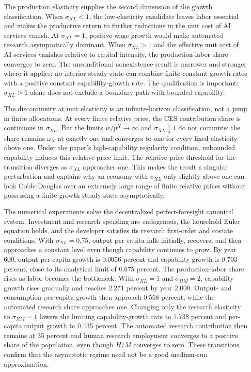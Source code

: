 The production elasticity supplies the second dimension of the growth classification.
When $\sigma_{XL}<1$, the low-elasticity candidate leaves labor essential
and makes the productive return to further reductions in the unit cost of AI services
vanish. At $\sigma_{XL}=1$, positive wage growth would make automated research
asymptotically dominant. When $\sigma_{XL}>1$ and the effective unit cost of AI
services vanishes relative to capital intensity, the production-labor share converges
to zero. The unconditional nonexistence result is narrower and stronger where it
applies: no interior steady state can combine finite constant growth rates with a
positive constant capability-growth rate. The qualification is important:
$\sigma_{XL}>1$ alone does not exclude a boundary path with bounded capability.

The discontinuity at unit elasticity is an infinite-horizon classification, not a
jump in finite allocations. At every finite relative price, the CES contribution
share is continuous in $\sigma_{XL}$. But the limits $w/p^X\to\infty$ and
$\sigma_{XL}\downarrow1$ do not commute: the share remains $\omega_X$ at exactly
one and converges to one for every fixed elasticity above one. Under the paper's
high-capability regularity condition, unbounded capability induces this relative-price
limit. The relative-price threshold for the
transition diverges as $\sigma_{XL}$ approaches one. This makes the result a singular
perturbation and explains why an economy with $\sigma_{XL}$ only slightly above one
can look Cobb--Douglas over an extremely large range of finite relative prices
without possessing a finite-growth steady state asymptotically.

The numerical experiments solve the decentralized perfect-foresight canonical system.
Investment and research spending are endogenous, the household Euler equation holds,
and the developer satisfies its research first-order and costate conditions. With
$\sigma_{XL}=0.75$, output per capita falls initially, recovers, and then approaches
a constant level even though capability continues to grow. By year 600,
output-per-capita growth is 0.0056 percent and capability growth is 0.703 percent,
close to its analytical limit of 0.675 percent. The production-labor share rises as
labor becomes the bottleneck. With $\sigma_{XL}=1$ and $\sigma_{HM}=2$, capability
growth rises gradually and reaches 2.271 percent by year 2,000. Output- and
consumption-per-capita growth then approach 0.568 percent, while the automated
research share approaches one. Changing only the research elasticity to
$\sigma_{HM}=1$ lowers the limiting capability-growth rate to 1.738 percent and
per-capita output growth to 0.435 percent. The automated research contribution then
remains at 35 percent and human research employment converges to a positive share
of the population, even though $H/M$ converges to zero.
These transitions confirm that the asymptotic regime need not be a good medium-run
approximation.


